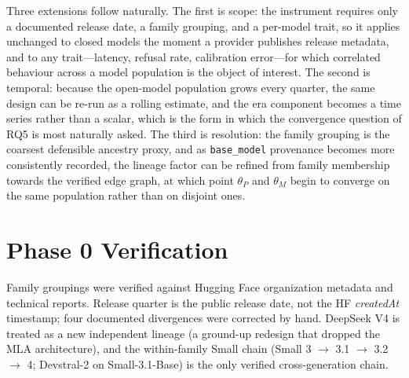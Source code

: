 \documentclass{ieeeaccess}
\theoremstyle{definition}
\theoremstyle{plain}
\begin{document}
Three extensions follow naturally. The first is scope: the instrument requires
only a documented release date, a family grouping, and a per-model trait, so it
applies unchanged to closed models the moment a provider publishes release
metadata, and to any trait---latency, refusal rate, calibration error---for
which correlated behaviour across a model population is the object of interest.
The second is temporal: because the open-model population grows every quarter,
the same design can be re-run as a rolling estimate, and the era component
becomes a time series rather than a scalar, which is the form in which the
convergence question of RQ5 is most naturally asked. The third is resolution:
the family grouping is the coarsest defensible ancestry proxy, and as
\texttt{base\_model} provenance becomes more consistently recorded, the lineage
factor can be refined from family membership towards the verified edge graph,
at which point $\theta_{P}$ and $\theta_{M}$ begin to converge on the same
population rather than on disjoint ones.

\appendices

\section{Phase 0 Verification}
\label{app:phase0}
Family groupings were verified against Hugging Face organization metadata and
technical reports. Release quarter is the public release date, not the HF
\emph{createdAt} timestamp; four documented divergences were corrected by hand.
DeepSeek V4 is treated as a new independent lineage (a ground-up redesign that
dropped the MLA architecture), and the within-family Small chain (Small
3 $\to$ 3.1 $\to$ 3.2 $\to$ 4; Devstral-2 on Small-3.1-Base) is the only verified
cross-generation chain.
\end{document}
